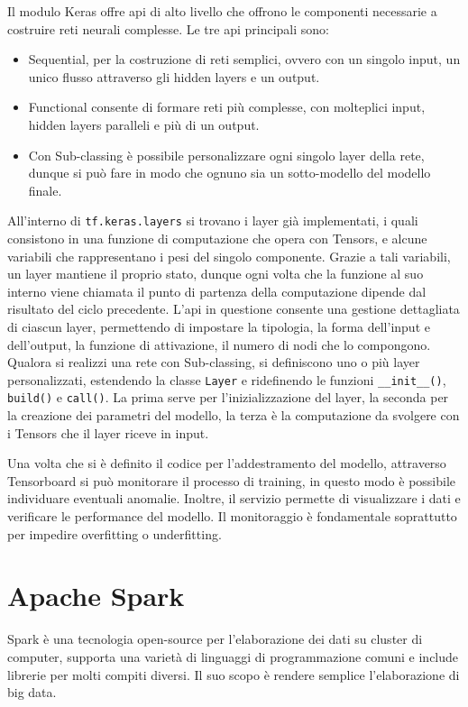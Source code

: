 \documentclass[12pt,a4paper,fleqn,titlepage]{report}
\begin{document}
        Il modulo Keras offre \gls{api} di alto livello che offrono le componenti necessarie a costruire reti neurali complesse. Le tre \gls{api} principali sono:
        \begin{itemize}
            \item Sequential, per la costruzione di reti semplici, ovvero con un singolo input, un unico flusso attraverso gli hidden layers e un output.
            \item Functional consente di formare reti più complesse, con molteplici input, hidden layers paralleli e più di un output.
            \item Con Sub-classing è possibile personalizzare ogni singolo layer della rete, dunque si può fare in modo che ognuno sia un sotto-modello del modello finale.
        \end{itemize}
        All'interno di \lstinline{tf.keras.layers} si trovano i layer già implementati, i quali consistono in una funzione di computazione che opera con Tensors, e alcune variabili che rappresentano i pesi del singolo componente. Grazie a tali variabili, un layer mantiene il proprio stato, dunque ogni volta che la funzione al suo interno viene chiamata il punto di partenza della computazione dipende dal risultato del ciclo precedente. L'\gls{api} in questione consente una gestione dettagliata di ciascun layer, permettendo di impostare la tipologia, la forma dell'input e dell'output, la funzione di attivazione, il numero di nodi che lo compongono. Qualora si realizzi una rete con Sub-classing, si definiscono uno o più layer personalizzati, estendendo la classe \lstinline{Layer} e ridefinendo le funzioni \lstinline{__init__()}, \lstinline{build()} e \lstinline{call()}. La prima serve per l'inizializzazione del layer, la seconda per la creazione dei parametri del modello, la terza è la computazione da svolgere con i Tensors che il layer riceve in input.

        Una volta che si è definito il codice per l'addestramento del modello, attraverso Tensorboard si può monitorare il processo di training, in questo modo è possibile individuare eventuali anomalie. Inoltre, il servizio permette di visualizzare i dati e verificare le performance del modello. Il monitoraggio è fondamentale soprattutto per impedire overfitting o underfitting.

    \section{Apache Spark}
        Spark è una tecnologia open-source per l'elaborazione dei dati su \gls{cluster} di computer, supporta una varietà di linguaggi di programmazione comuni e include librerie per molti compiti diversi. Il suo scopo è rendere semplice l'elaborazione di \gls{big data}.
\end{document}
